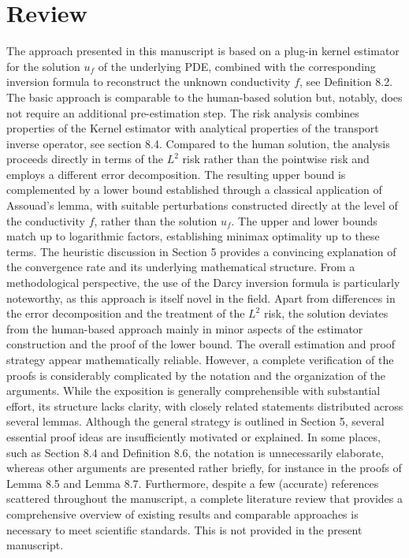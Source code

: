 \documentclass[11pt]{article}
\theoremstyle{definition}
\theoremstyle{remark}
\begin{document}
\maketitle

\section{Review}

The approach presented in this manuscript is based on a plug-in kernel estimator for the solution \(u_f\) of the underlying PDE, combined with the corresponding inversion formula to reconstruct the unknown conductivity \(f\), see Definition 8.2. The basic approach is comparable to the human-based solution but, notably, does not require an additional pre-estimation step. The risk analysis combines properties of the Kernel estimator with analytical properties of the transport inverse operator, see section 8.4. Compared to the human solution, the analysis proceeds directly in terms of the \(L^2\) risk rather than the pointwise risk and employs a different error decomposition. The resulting upper bound is complemented by a lower bound established through a classical application of Assouad's lemma, with suitable perturbations constructed directly at the level of the conductivity \(f\), rather than the solution \(u_f\). The upper and lower bounds match up to logarithmic factors, establishing minimax optimality up to these terms. The heuristic discussion in Section 5 provides a convincing explanation of the convergence rate and its underlying mathematical structure. From a methodological perspective, the use of the Darcy inversion formula is particularly noteworthy, as this approach is itself novel in the field. Apart from differences in the error decomposition and the treatment of the \(L^2\) risk, the solution deviates from the human-based approach mainly in minor aspects of the estimator construction and the proof of the lower bound.
The overall estimation and proof strategy appear mathematically reliable. However, a complete verification of the proofs is considerably complicated by the notation and the organization of the arguments. While the exposition is generally comprehensible with substantial effort, its structure lacks clarity, with closely related statements distributed across several lemmas.  Although the general strategy is outlined in Section 5, several essential proof ideas are insufficiently motivated or explained. In some places, such as Section 8.4 and Definition 8.6, the notation is unnecessarily elaborate, whereas other arguments are presented rather briefly, for instance in the proofs of Lemma 8.5 and Lemma 8.7. 
Furthermore, despite a few (accurate) references scattered throughout the manuscript, a complete literature review that provides a comprehensive overview of existing results and comparable approaches is necessary to meet scientific standards. This is not provided in the present manuscript. 
\end{document}
